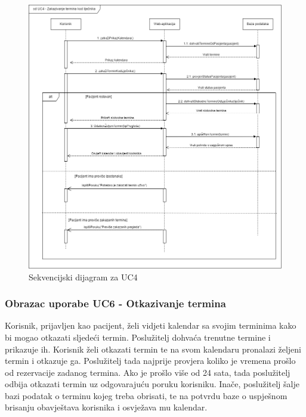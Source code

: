 				
				\begin{figure}[H]
			            \includegraphics[width=\textwidth]{slike/sd_uc4_v2.png} %
			            \caption{Sekvencijski dijagram za UC4}
			            \label{fig:sd1} %
		            \end{figure}
		            
		        \eject
				
				\subsubsection{Obrazac uporabe UC6 - Otkazivanje termina}
				
				Korisnik, prijavljen kao pacijent, želi vidjeti kalendar sa svojim terminima kako bi mogao otkazati sljedeći termin. Poslužitelj dohvaća trenutne termine i prikazuje ih. Korisnik želi otkazati termin te na svom kalendaru pronalazi željeni termin i otkazuje ga. Poslužitelj tada najprije provjera koliko je vremena prošlo od rezervacije zadanog termina. Ako je prošlo više od 24 sata, tada poslužitelj odbija otkazati termin uz odgovarajuću poruku korisniku. Inače, poslužitelj šalje bazi podatak o terminu kojeg treba obrisati, te na potvrdu baze o uspješnom brisanju obavještava korisnika i osvježava mu kalendar.
				
